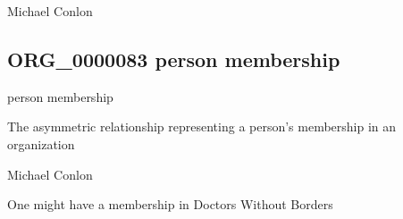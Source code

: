 \documentclass[letterpaper,10pt,english]{sphinxmanual}
\begin{document}
\begin{sphinxShadowBox}

\sphinxAtStartPar
Michael Conlon 
\end{sphinxShadowBox}
\begin{quote}

\ignorespaces \end{quote}


\subsection{ORG\_0000083 \sphinxhyphen{} person membership}
\label{\detokenize{doc-ORG_0000083:org-0000083-person-membership}}\label{\detokenize{doc-ORG_0000083:index-0}}\label{\detokenize{doc-ORG_0000083::doc}}
\begin{sphinxShadowBox}

\sphinxAtStartPar
person membership
\end{sphinxShadowBox}

\begin{sphinxShadowBox}

\sphinxAtStartPar
{\hyperref[\detokenize{doc-BFO_0000003::doc}]{}}
\end{sphinxShadowBox}

\begin{sphinxShadowBox}

\sphinxAtStartPar
The asymmetric relationship representing a person’s membership in an organization
\end{sphinxShadowBox}

\begin{sphinxShadowBox}

\sphinxAtStartPar
Michael Conlon 
\end{sphinxShadowBox}

\begin{sphinxShadowBox}

\sphinxAtStartPar
One might have a membership in Doctors Without Borders
\end{sphinxShadowBox}
\end{document}
